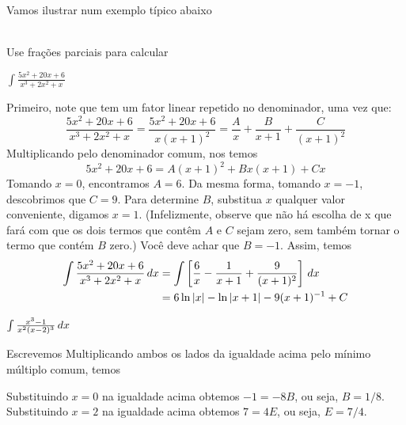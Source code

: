 \cleardoublepage\documentclass[../main.tex]{subfiles}
\begin{document}
Vamos ilustrar num exemplo típico abaixo
\begin{ex}~\label{FracParcFatLinearesRepetidos}
\\Use frações parciais para calcular\\
\begin{compactenum}[a)]
\item $\int\frac{5x^2+20x+6}{x^3+2x^2+x}$

\begin{sol}
Primeiro, note que tem um fator linear repetido no denominador, uma vez que:
\begin{equation*}
    \frac{5x^2+20x+6}{x^3+2x^2+x}=\frac{5x^2+20x+6}{x(x+1)^2}=\frac{A}{x}+\frac{B}{x+1}+\frac{C}{(x+1)^2}
\end{equation*}
Multiplicando pelo denominador comum, nos temos
\begin{equation*}
  5x^2+20x+6=A(x+1)^2+Bx(x+1)+Cx  
\end{equation*}
Tomando \(x = 0\), encontramos \(A = 6\). Da mesma forma, tomando \(x = -1\), descobrimos que \(C = 9\). Para determine \(B\), substitua $x$ qualquer valor conveniente, digamos \(x = 1\). (Infelizmente, observe que não há escolha de x que fará com que os dois termos que contêm \(A\) e \(C\) sejam zero, sem também tornar o termo que contém \(B\) zero.) Você deve achar que \(B = -1\). Assim, temos
\begin{align*}
    \int \frac{5x^2+20x+6}{x^3+2x^2+x}\, dx& =\int\left[\frac{6}{x}-\frac{1}{x+1}+\frac{9}{(x+1)^2}\right]\, dx\\
    &=6\ln |x|-\ln |x+1|-9(x+1)^{-1}+C
\end{align*}
\end{sol}
\item $\int \frac{x^3-1}{x^2(x-2)^3} \, dx$

\begin{sol}
Escrevemos
Multiplicando ambos os lados da igualdade acima pelo mínimo múltiplo
comum, temos

Substituindo $x = 0$ na igualdade acima obtemos $-1 = -8B$, ou seja, $B =1/8$. Substituindo $x = 2$ na igualdade acima obtemos $7 = 4E$, ou seja, $E =7/4$.


\end{sol}
\end{compactenum}
\end{ex}
\end{document}
